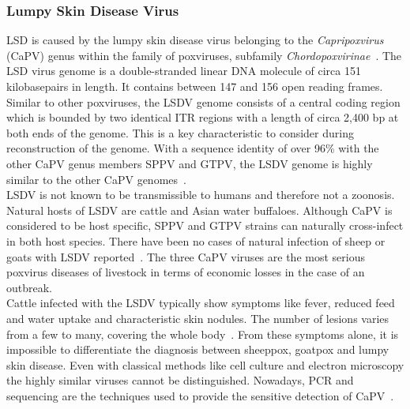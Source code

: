 \subsubsection*{Lumpy Skin Disease Virus}
\ac{LSD} is caused by the lumpy skin disease virus belonging to the \textit{Capripoxvirus} (CaPV) genus within the family of poxviruses, subfamily \textit{Chordopoxvirinae}~\cite{walker2019changes}. The \ac{LSD} virus genome is a double-stranded linear \ac{DNA} molecule of circa 151 kilobasepairs in length. It contains between 147 and 156 open reading frames. Similar to other poxviruses, the \ac{LSDV} genome consists of a central coding region which is bounded by two identical \ac{ITR} regions with a length of circa 2,400 bp at both ends of the genome. This is a key characteristic to consider during reconstruction of the genome. With a sequence identity of over 96\% with the other \acs{CaPV} genus members \ac{SPPV} and \ac{GTPV}, the \ac{LSDV} genome is highly similar to the other \acs{CaPV} genomes~\cite{tulman2001genome}. \\
\ac{LSDV} is not known to be transmissible to humans and therefore not a zoonosis. Natural hosts of \ac{LSDV} are cattle and Asian water buffaloes. Although \acs{CaPV} is considered to be host specific, \ac{SPPV} and \ac{GTPV} strains can naturally cross-infect in both host species. There have been no cases of natural infection of sheep or goats with \ac{LSDV} reported~\cite{namazi2021lumpy}. The three \acs{CaPV} viruses are the most serious poxvirus diseases of livestock in terms of economic losses in the case of an outbreak. \\
Cattle infected with the \ac{LSDV} typically show symptoms like fever, reduced feed and water uptake and characteristic skin nodules. The number of lesions varies from a few to many, covering the whole body~\cite{prozesky1982study}. From these symptoms alone, it is impossible to differentiate the diagnosis between sheeppox, goatpox and lumpy skin disease. Even with classical methods like cell culture and electron microscopy the highly similar viruses cannot be distinguished. Nowadays, \ac{PCR} and sequencing are the techniques used to provide the sensitive detection of \acs{CaPV}~\cite{lafar2020capripoxvirus}.


